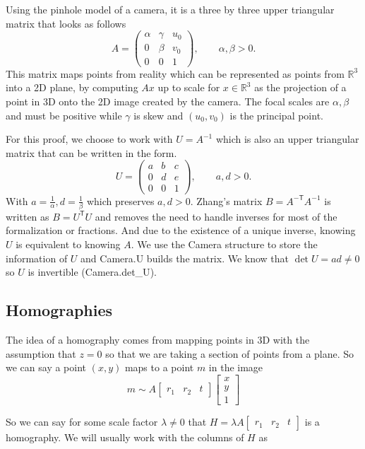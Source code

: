 \documentclass[10pt]{article}
\theoremstyle{plain}
\theoremstyle{definition}
\theoremstyle{remark}
\newcommand{\T}{^{\mathsf{T}}}
\newcommand{\lean}[1]{{\ttfamily\let\us\_\def\_{\us\allowbreak}#1}}
\begin{document}
Using the pinhole model of a camera, it is a three by three upper triangular matrix that looks as follows
\[
A = \begin{pmatrix} \alpha & \gamma & u_0 \\ 0 & \beta & v_0 \\ 0 & 0 & 1 \end{pmatrix},
  \qquad \alpha, \beta > 0.
\]
This matrix maps points from reality which can be represented as points from $\mathbb{R}^3$ into a 2D plane, by computing $Ax$ up to scale for $x \in \mathbb{R}^3$ as the projection of a point in 3D onto the 2D image created by the camera. The focal scales are $\alpha, \beta$ and must be positive while $\gamma$ is skew and $(u_0,v_0)$ is the principal point.

For this proof, we choose to work with $U=A^{-1}$ which is also an upper triangular matrix that can be written in the form.
\[
  U = \begin{pmatrix} a & b & c \\ 0 & d & e \\ 0 & 0 & 1 \end{pmatrix},
  \qquad a, d > 0.
\]
With $a = \frac{1}{\alpha}, d =\frac{1}{\beta}$ which preserves $a, d > 0$. Zhang's matrix $B=A^{-\mathsf{T}}A^{-1}$ is written as $B=U\T U$ and removes the need to handle inverses for most of the formalization or fractions. And due to the existence of a unique inverse, knowing $U$ is equivalent to knowing $A$. We use the \lean{Camera} structure to store the information of $U$ and \lean{Camera.U} builds the matrix. We know that $\det U=ad\neq 0$ so $U$ is invertible (\lean{Camera.det\_U}).

\subsection{Homographies}

The idea of a homography comes from mapping points in 3D with the assumption that $z=0$ so that we are taking a section of points from a plane. So we can say a point $(x,y)$ maps to a point $m$ in the image 
$$m \sim A \begin{bmatrix} r_1 & r_2 & t\end{bmatrix}\begin{bmatrix} x \\ y \\ 1\end{bmatrix}$$

So we can say for some scale factor $\lambda \neq 0$ that $H=\lambda A \begin{bmatrix} r_1 & r_2 & t\end{bmatrix}$ is a homography. We will usually work with the columns of $H$ as 
\end{document}
